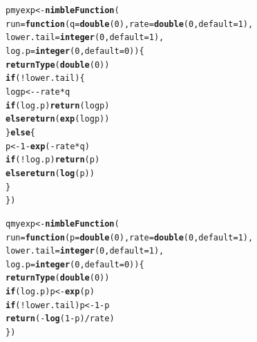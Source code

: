 \documentclass[12pt,oneside]{book}\usepackage[]{graphicx}\usepackage[]{color}
\makeatletter
\newcommand{\hlnum}[1]{\textcolor[rgb]{0.686,0.059,0.569}{#1}}%
\newcommand{\hlopt}[1]{\textcolor[rgb]{0,0,0}{#1}}%
\newcommand{\hlstd}[1]{\textcolor[rgb]{0.345,0.345,0.345}{#1}}%
\newcommand{\hlkwa}[1]{\textcolor[rgb]{0.161,0.373,0.58}{\textbf{#1}}}%
\newcommand{\hlkwb}[1]{\textcolor[rgb]{0.69,0.353,0.396}{#1}}%
\newcommand{\hlkwc}[1]{\textcolor[rgb]{0.333,0.667,0.333}{#1}}%
\newcommand{\hlkwd}[1]{\textcolor[rgb]{0.737,0.353,0.396}{\textbf{#1}}}%
\newenvironment{kframe}{%
 \def\at@end@of@kframe{}%
 \ifinner\ifhmode%
  \def\at@end@of@kframe{\end{minipage}}%
  \begin{minipage}{\columnwidth}%
 \fi\fi%
 \def\FrameCommand##1{\hskip\@totalleftmargin \hskip-\fboxsep
 \colorbox{shadecolor}{##1}\hskip-\fboxsep
     \hskip-\linewidth \hskip-\@totalleftmargin \hskip\columnwidth}%
 \MakeFramed {\advance\hsize-\width
   \@totalleftmargin\z@ \linewidth\hsize
   \@setminipage}}%
 {\par\unskip\endMakeFramed%
 \at@end@of@kframe}
\newenvironment{knitrout}{}{} %
\makeatother
\begin{document}
\begin{knitrout}
\begin{kframe}
\begin{alltt}
\hlstd{pmyexp} \hlkwb{<-} \hlkwd{nimbleFunction}\hlstd{(}
    \hlkwc{run} \hlstd{=} \hlkwa{function}\hlstd{(}\hlkwc{q} \hlstd{=} \hlkwd{double}\hlstd{(}\hlnum{0}\hlstd{),} \hlkwc{rate} \hlstd{=} \hlkwd{double}\hlstd{(}\hlnum{0}\hlstd{,} \hlkwc{default} \hlstd{=} \hlnum{1}\hlstd{),}
        \hlkwc{lower.tail} \hlstd{=} \hlkwd{integer}\hlstd{(}\hlnum{0}\hlstd{,} \hlkwc{default} \hlstd{=} \hlnum{1}\hlstd{),}
        \hlkwc{log.p} \hlstd{=} \hlkwd{integer}\hlstd{(}\hlnum{0}\hlstd{,} \hlkwc{default} \hlstd{=} \hlnum{0}\hlstd{)) \{}
        \hlkwd{returnType}\hlstd{(}\hlkwd{double}\hlstd{(}\hlnum{0}\hlstd{))}
        \hlkwa{if}\hlstd{(}\hlopt{!}\hlstd{lower.tail) \{}
            \hlstd{logp} \hlkwb{<-} \hlopt{-}\hlstd{rate} \hlopt{*} \hlstd{q}
            \hlkwa{if}\hlstd{(log.p)} \hlkwd{return}\hlstd{(logp)}
            \hlkwa{else} \hlkwd{return}\hlstd{(}\hlkwd{exp}\hlstd{(logp))}
        \hlstd{\}} \hlkwa{else} \hlstd{\{}
            \hlstd{p} \hlkwb{<-} \hlnum{1} \hlopt{-} \hlkwd{exp}\hlstd{(}\hlopt{-}\hlstd{rate} \hlopt{*} \hlstd{q)}
            \hlkwa{if}\hlstd{(}\hlopt{!}\hlstd{log.p)} \hlkwd{return}\hlstd{(p)}
            \hlkwa{else} \hlkwd{return}\hlstd{(}\hlkwd{log}\hlstd{(p))}
        \hlstd{\}}
    \hlstd{\})}

\hlstd{qmyexp} \hlkwb{<-} \hlkwd{nimbleFunction}\hlstd{(}
    \hlkwc{run} \hlstd{=} \hlkwa{function}\hlstd{(}\hlkwc{p} \hlstd{=} \hlkwd{double}\hlstd{(}\hlnum{0}\hlstd{),} \hlkwc{rate} \hlstd{=} \hlkwd{double}\hlstd{(}\hlnum{0}\hlstd{,} \hlkwc{default} \hlstd{=} \hlnum{1}\hlstd{),}
        \hlkwc{lower.tail} \hlstd{=} \hlkwd{integer}\hlstd{(}\hlnum{0}\hlstd{,} \hlkwc{default} \hlstd{=} \hlnum{1}\hlstd{),}
        \hlkwc{log.p} \hlstd{=} \hlkwd{integer}\hlstd{(}\hlnum{0}\hlstd{,} \hlkwc{default} \hlstd{=} \hlnum{0}\hlstd{)) \{}
        \hlkwd{returnType}\hlstd{(}\hlkwd{double}\hlstd{(}\hlnum{0}\hlstd{))}
        \hlkwa{if}\hlstd{(log.p) p} \hlkwb{<-} \hlkwd{exp}\hlstd{(p)}
        \hlkwa{if}\hlstd{(}\hlopt{!}\hlstd{lower.tail) p} \hlkwb{<-} \hlnum{1} \hlopt{-} \hlstd{p}
        \hlkwd{return}\hlstd{(}\hlopt{-}\hlkwd{log}\hlstd{(}\hlnum{1} \hlopt{-} \hlstd{p)} \hlopt{/} \hlstd{rate)}
    \hlstd{\})}


\end{alltt}
\end{kframe}
\end{knitrout}
\end{document}
